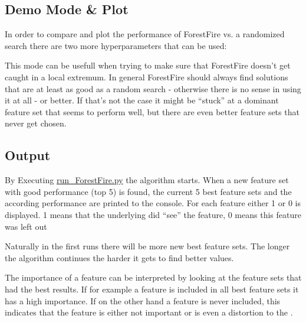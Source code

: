 \documentclass[letterpaper,10pt,english]{sphinxmanual}
\begin{document}
\subsection{Demo Mode \& Plot}
\label{\detokenize{execution:demo-mode-plot}}
In order to compare and plot the performance of ForestFire vs. a randomized search there are two more hyperparameters that can be used:

\begin{sphinxVerbatim}[commandchars=\\\{\}]

  
\end{sphinxVerbatim}

This mode can be usefull when trying to make sure that ForestFire doesn't get caught in a local extremum.
In general ForestFire should always find solutions that are at least as good as a random search - otherwise there is no sense in using it at all - or better.
If that's not the case it might be ``stuck'' at a dominant feature set that seems to perform well, but there are even better feature sets that never get chosen.


\subsection{Output}
\label{\detokenize{execution:output}}
By Executing \href{https://github.com/weinertmos/ForestFire/blob/master/source/ForestFire/run\_ForestFire.py}{run\_ForestFire.py} the algorithm starts.
When a new feature set with good performance (top 5) is found, the current 5 best feature sets and the according performance are printed to the console.
For each feature either 1 or 0 is displayed.
1 means that the underlying {\hyperref[\detokenize{Overview:mla}]{}} did ``see'' the feature, 0 means this feature was left out

Naturally in the first runs there will be more new best feature sets.
The longer the algorithm continues the harder it gets to find better values.

The importance of a feature can be interpreted by looking at the feature sets that had the best results.
If for example a feature is included in all best feature sets it has a high importance.
If on the other hand a feature is never included, this indicates that the feature is either not important or is even a distortion to the {\hyperref[\detokenize{Overview:mla}]{}}.
\end{document}
